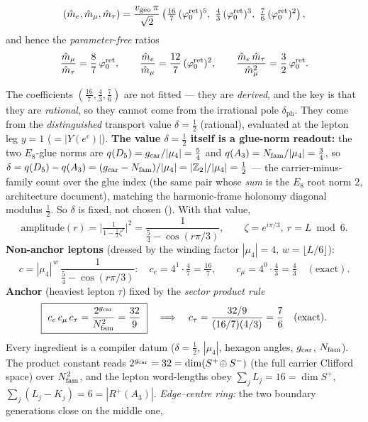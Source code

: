 \begin{keybox}
\[
  (\hat m_e,\hat m_\mu,\hat m_\tau)=\frac{\vgeo\,\pi}{\sqrt2}\left(\tfrac{16}{7}\,(\phiz)^{5},\ \tfrac{4}{3}\,(\phiz)^{3},\ \tfrac{7}{6}\,(\phiz)^{2}\right),
\]
and hence the \emph{parameter-free} ratios
\[
  \frac{\hat m_\mu}{\hat m_\tau}=\frac{8}{7}\,\varphi_0^{\mathrm{ret}},\qquad
  \frac{\hat m_e}{\hat m_\mu}=\frac{12}{7}\,(\varphi_0^{\mathrm{ret}})^{2},\qquad
  \frac{\hat m_e\,\hat m_\tau}{\hat m_\mu^{2}}=\frac{3}{2}\,\varphi_0^{\mathrm{ret}} .
\]
\end{keybox}

\begin{keybox}[Where the lepton rationals come from: $\delta=\tfrac12$ resolvent $+$ product rule \mE]
The coefficients $(\tfrac{16}{7},\tfrac43,\tfrac76)$ are not fitted --- they are \emph{derived}, and the
key is that they are \emph{rational}, so they cannot come from the irrational pole $\delta_{\mathrm{ph}}$.
They come from the \emph{distinguished} transport value $\delta=\tfrac12$ (rational), evaluated at the
lepton leg $y=1$ ($=|Y(e^c)|$). \textbf{The value $\delta=\tfrac12$ itself is a glue-norm readout:} the two $E_8$-glue norms are
$q(D_5)=g_{\mathrm{car}}/|\mu_4|=\tfrac54$ and $q(A_3)=N_{\mathrm{fam}}/|\mu_4|=\tfrac34$, so
$\delta=q(D_5)-q(A_3)=(g_{\mathrm{car}}-N_{\mathrm{fam}})/|\mu_4|=|\mathbb{Z}_2|/|\mu_4|=\tfrac12$ --- the carrier-minus-family count over
the glue index (the same pair whose \emph{sum} is the $E_8$ root norm $2$, architecture document), matching the
harmonic-frame holonomy diagonal modulus $\tfrac12$. So $\delta$ is fixed, not chosen
(). With that value,
\[
  \text{amplitude}(r)=\Big|\tfrac{1}{1-\tfrac12\zeta^{r}}\Big|^{2}=\frac{1}{\tfrac54-\cos(r\pi/3)},
  \qquad \zeta=e^{i\pi/3},\ r=L\bmod 6 .
\]
\textbf{Non-anchor leptons} (dressed by the winding factor $|\mu_4|=4$, $w=\lfloor L/6\rfloor$):
\[
  c=|\mu_4|^{\,w}\,\frac{1}{\tfrac54-\cos(r\pi/3)}:\quad
  c_e=4^{1}\!\cdot\!\tfrac{4}{7}=\tfrac{16}{7},\qquad
  c_\mu=4^{0}\!\cdot\!\tfrac{4}{3}=\tfrac{4}{3}\quad(\text{exact}).
\]
\textbf{Anchor} (heaviest lepton $\tau$) fixed by the \emph{sector product rule}
\[
  \boxed{\ c_e\,c_\mu\,c_\tau=\frac{2^{\gcar}}{\Nfam^{2}}=\frac{32}{9}\ }
  \quad\Longrightarrow\quad c_\tau=\frac{32/9}{(16/7)(4/3)}=\frac{7}{6}\quad(\text{exact}).
\]
Every ingredient is a compiler datum ($\delta{=}\tfrac12$, $|\mu_4|$, hexagon angles, $g_{\mathrm{car}}$, $N_{\mathrm{fam}}$).
The product constant reads $2^{g_{\mathrm{car}}}=32=\dim(S^+\!\oplus S^-)$ (the full carrier Clifford space) over
$N_{\mathrm{fam}}^2$, and the lepton word-lengths obey $\sum_j L_j=16=\dim S^+$, $\sum_j(L_j-K_j)=6=|R^+(A_3)|$.
\emph{Edge--centre ring:} the two boundary generations close on the middle one,

\end{keybox}
